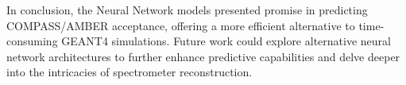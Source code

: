 \documentclass[EPJ,twocolumn]{webofc}
\begin{document}
In conclusion, the Neural Network models presented promise in predicting COMPASS/AMBER acceptance, offering a more efficient
alternative to time-consuming GEANT4 simulations. Future work could explore alternative neural network architectures to further
enhance predictive capabilities and delve deeper into the intricacies of spectrometer reconstruction.





%
\end{document}
